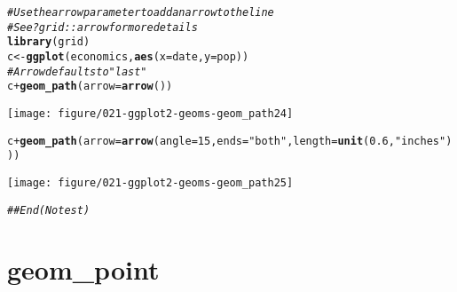 \documentclass[a4paper,titlepage]{tufte-handout}\usepackage[]{graphicx}\usepackage[]{color}
\makeatletter
\def\maxwidth{ %
  \ifdim\Gin@nat@width>\linewidth
    \linewidth
  \else
    \Gin@nat@width
  \fi
}
\newcommand{\hlnum}[1]{\textcolor[rgb]{0.686,0.059,0.569}{#1}}%
\newcommand{\hlstr}[1]{\textcolor[rgb]{0.192,0.494,0.8}{#1}}%
\newcommand{\hlcom}[1]{\textcolor[rgb]{0.678,0.584,0.686}{\textit{#1}}}%
\newcommand{\hlopt}[1]{\textcolor[rgb]{0,0,0}{#1}}%
\newcommand{\hlstd}[1]{\textcolor[rgb]{0.345,0.345,0.345}{#1}}%
\newcommand{\hlkwb}[1]{\textcolor[rgb]{0.69,0.353,0.396}{#1}}%
\newcommand{\hlkwc}[1]{\textcolor[rgb]{0.333,0.667,0.333}{#1}}%
\newcommand{\hlkwd}[1]{\textcolor[rgb]{0.737,0.353,0.396}{\textbf{#1}}}%
\newenvironment{kframe}{%
 \def\at@end@of@kframe{}%
 \ifinner\ifhmode%
  \def\at@end@of@kframe{\end{minipage}}%
  \begin{minipage}{\columnwidth}%
 \fi\fi%
 \def\FrameCommand##1{\hskip\@totalleftmargin \hskip-\fboxsep
 \colorbox{shadecolor}{##1}\hskip-\fboxsep
     \hskip-\linewidth \hskip-\@totalleftmargin \hskip\columnwidth}%
 \MakeFramed {\advance\hsize-\width
   \@totalleftmargin\z@ \linewidth\hsize
   \@setminipage}}%
 {\par\unskip\endMakeFramed%
 \at@end@of@kframe}
\newenvironment{knitrout}{}{} %
\makeatother
\begin{document}
\begin{knitrout}
\begin{kframe}
\begin{alltt}
\hlcom{# Use the arrow parameter to add an arrow to the line}
\hlcom{# See ?grid::arrow for more details}
\hlkwd{library}\hlstd{(grid)}
\hlstd{c} \hlkwb{<-} \hlkwd{ggplot}\hlstd{(economics,} \hlkwd{aes}\hlstd{(}\hlkwc{x} \hlstd{= date,} \hlkwc{y} \hlstd{= pop))}
\hlcom{# Arrow defaults to "last"}
\hlstd{c} \hlopt{+} \hlkwd{geom_path}\hlstd{(}\hlkwc{arrow} \hlstd{=} \hlkwd{arrow}\hlstd{())}
\end{alltt}
\end{kframe}
\texttt{[image: figure/021-ggplot2-geoms-geom\_path24]} 
\begin{kframe}\begin{alltt}
\hlstd{c} \hlopt{+} \hlkwd{geom_path}\hlstd{(}\hlkwc{arrow} \hlstd{=} \hlkwd{arrow}\hlstd{(}\hlkwc{angle} \hlstd{=} \hlnum{15}\hlstd{,} \hlkwc{ends} \hlstd{=} \hlstr{"both"}\hlstd{,} \hlkwc{length} \hlstd{=} \hlkwd{unit}\hlstd{(}\hlnum{0.6}\hlstd{,} \hlstr{"inches"}\hlstd{)))}
\end{alltt}
\end{kframe}
\texttt{[image: figure/021-ggplot2-geoms-geom\_path25]} 
\begin{kframe}\begin{alltt}
\hlcom{## End(No test)}
\end{alltt}
\end{kframe}
\end{knitrout}



\section{geom\_point}
\end{document}
